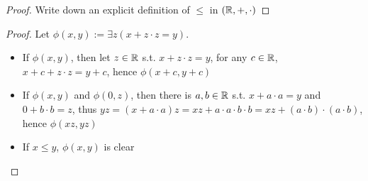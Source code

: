 \documentclass[11pt]{article}
\begin{document}
\begin{proof}
Write down an explicit definition of \(\le\) in \((\mathbb{R},+,\cdot)\)
\end{proof}

\begin{proof}
Let \(\phi(x,y):=\exists z(x+z\cdot z=y)\).
\begin{itemize}
\item If \(\phi(x,y)\), then let \(z\in\mathbb{R}\) s.t. \(x+z\cdot z=y\), for any \(c\in\mathbb{R}\), \(x+c+z\cdot z=y+c\),
hence \(\phi(x+c,y+c)\)
\item If \(\phi(x,y)\) and \(\phi(0,z)\), then there is \(a,b\in\mathbb{R}\) s.t. \(x+a\cdot a=y\) and \(0+b\cdot b=z\), thus
\(yz=(x+a\cdot a)z=xz+a\cdot a\cdot b\cdot b=xz+(a\cdot b)\cdot(a\cdot b)\), hence \(\phi(xz,yz)\)
\item If \(x\le y\), \(\phi(x,y)\) is clear
\end{itemize}
\end{proof}
\end{document}

